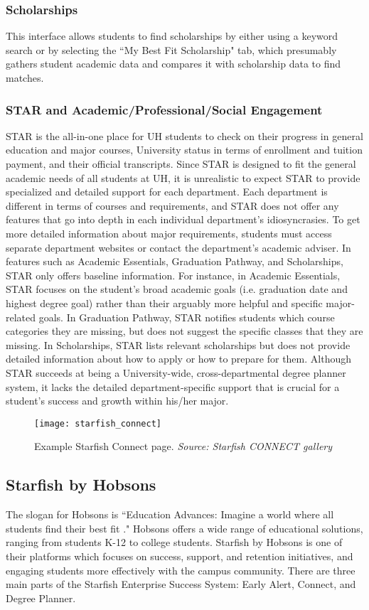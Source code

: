 \subsubsection{Scholarships}
This interface allows students to find scholarships by either using a keyword search or by selecting the ``My Best Fit Scholarship" tab, which presumably gathers student academic data and compares it with scholarship data to find matches.

\subsubsection{STAR and Academic/Professional/Social Engagement}
STAR is the all-in-one place for UH students to check on their progress in general education and major courses, University status in terms of enrollment and tuition payment, and their official transcripts. Since STAR is designed to fit the general academic needs of all students at UH, it is unrealistic to expect STAR to provide specialized and detailed support for each department. Each department is different in terms of courses and requirements, and STAR does not offer any features that go into depth in each individual department's idiosyncrasies. To get more detailed information about major requirements, students must access separate department websites or contact the department's academic adviser. 
In features such as Academic Essentials, Graduation Pathway, and Scholarships, STAR only offers baseline information. For instance, in Academic Essentials, STAR focuses on the student's broad academic goals (i.e. graduation date and highest degree goal) rather than their arguably more helpful and specific major-related goals. In Graduation Pathway, STAR notifies students which course categories they are missing, but does not suggest the specific classes that they are missing. In Scholarships, STAR lists relevant scholarships but does not provide detailed information about how to apply or how to prepare for them. Although STAR succeeds at being a University-wide, cross-departmental degree planner system, it lacks the detailed department-specific support that is crucial for a student's success and growth within his/her major. 

\begin{figure}[h]
\centering
\texttt{[image: starfish\_connect]}
\caption{Example Starfish Connect page. \textit{Source: Starfish CONNECT gallery}}
\end{figure}
\subsection{Starfish by Hobsons}
The slogan for Hobsons is ``Education Advances: Imagine a world where all students find their best fit \cite{Starfish}." Hobsons offers a wide range of educational solutions, ranging from students K-12 to college students. Starfish by Hobsons is one of their platforms which focuses on success, support, and retention initiatives, and engaging students more effectively with the campus community. There are three main parts of the Starfish Enterprise Success System: Early Alert, Connect, and Degree Planner.
